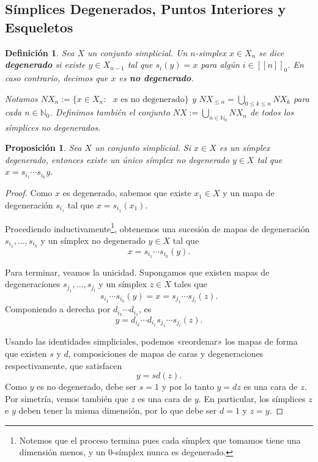 \documentclass[11pt]{report}
\theoremstyle{colored}
\newtheorem{definition}{Definición}[section]
\newtheorem{proposition}{Proposición}[section]
\newcommand{\N}{\mathbb{N}}
\newcommand{\nat}[1]{[\![#1]\!]}
\newcommand{\natzero}[1]{\nat{#1}_0}
\begin{document}
\subsection{Símplices Degenerados, Puntos Interiores y Esqueletos}

\begin{definition} Sea $X$ un conjunto simplicial. Un $n$-simplex $x \in X_n$ se dice \textbf{degenerado} si existe $y \in X_{n-1}$ tal que $s_i(y) = x$ para algún $i \in \natzero{n}$. En caso contrario, decimos que $x$ es \textbf{no degenerado}. 

Notamos $NX_n := \{x \in X_n : \text{ $x$ es no degenerado}\}$ y $NX_{\leq n} = \bigcup_{0 \leq k \leq n}NX_k$ para cada $n \in \N_0$. Definimos también el conjunto $NX := \bigcup_{n \in \N_0}NX_n$ de todos los símplices no degenerados.
\end{definition}

\begin{proposition} Sea $X$ un conjunto simplicial. Si $x \in X$ es un símplex degenerado, entonces existe un único símplex no degenerado $y \in X$ tal que $x = s_{i_1} \cdots s_{i_k}y$.
\end{proposition}
\begin{proof} Como $x$ es degenerado, sabemos que existe $x_1 \in X$ y un mapa de degeneración $s_{i_1}$ tal que $x = s_{i_1}(x_1)$. 

Procediendo inductivamente\footnote{Notemos que el proceso termina pues cada símplex que tomamos tiene una dimensión menos, y un $0$-símplex nunca es degenerado.}, obtenemos una sucesión de mapas de degeneración $s_{i_1},\dots, s_{i_k}$ y un símplex no degenerado $y \in X$ tal que
\[
x = s_{i_1} \cdots s_{i_k}(y).
\]

Para terminar, veamos la unicidad. Supongamos que existen mapas de degeneraciones $s_{j_1}, \dots, s_{j_l}$ y un símplex $z \in X$ tales que
\[
s_{i_1} \cdots s_{i_k}(y) = x = s_{j_1} \cdots s_{j_l}(z).
\]
Componiendo a derecha por $d_{i_k} \cdots d_{i_1}$, es
\[
y = d_{i_k} \cdots d_{i_1}s_{j_1} \cdots s_{j_l}(z).
\]

Usando las identidades simpliciales, podemos «reordenar» los mapas de forma que existen $s$ y $d$, composiciones de mapas de caras y degeneraciones respectivamente, que satisfacen
\[
y = sd(z).
\]
Como $y$ es no degenerado, debe ser $s = 1$ y por lo tanto $y = dz$ es una cara de $z$. Por simetría, vemos también que $z$ es una cara de $y$. En particular, los símplices $z$ e $y$ deben tener la misma dimensión, por lo que debe ser $d = 1$ y $z = y$. 
\end{proof}
\end{document}
